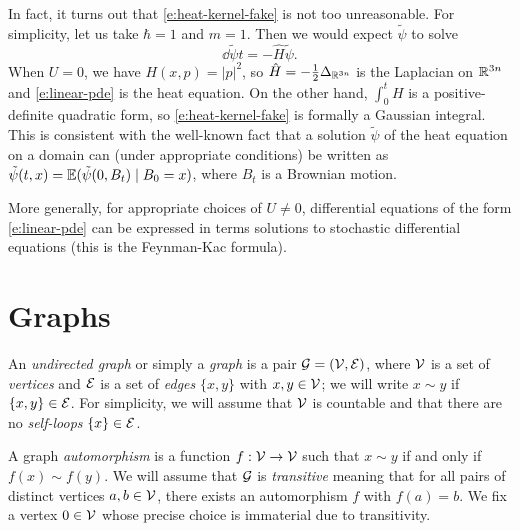 \begin{rk}
In fact, it turns out that \eqref{e:heat-kernel-fake} is not too unreasonable.
For simplicity, let us take $\hbar = 1$ and $m = 1$.
Then we would expect $\tilde\psi$ to solve
\begin{equation}
\label{e:linear-pde}
\dd{\tilde\psi}{t} = -\hat H \tilde\psi.
\end{equation}
When $U = 0$, we have $H(x, p) = |p|^2$, so $\hat H = -\tfrac12 \Delta_{{\mathbb R}^{3n}}$
is the Laplacian on ${\mathbb R}^{3n}$ and \eqref{e:linear-pde} is the heat equation.
On the other hand, $\int_0^t H$ is a positive-definite quadratic form, so
\eqref{e:heat-kernel-fake} is formally a Gaussian integral. This is consistent
with the well-known fact that a solution $\tilde\psi$ of the heat equation
on a domain can (under appropriate conditions) be written as
$\tilde\psi(t, x) = \mathbb{E}(\tilde\psi(0, B_t) \mid B_0 = x)$,
where $B_t$ is a Brownian motion.

More generally, for appropriate choices of $U \ne 0$, differential equations of
the form \eqref{e:linear-pde} can be expressed in terms
solutions to stochastic differential equations (this is the Feynman-Kac formula).
\end{rk}


\section{Graphs}
\label{sec:graphs}


An \emph{undirected graph} or simply a \emph{graph} is a pair $\mathcal{G} = (\mathcal{V}, \mathcal{E})$,
where $\mathcal{V}$
is a set of \emph{vertices} and $\mathcal{E}$ is a set of
\emph{edges} $\{ x, y \}$ with $x, y \in \mathcal{V}$; we will write $x \sim y$ if
$\{ x, y \} \in \mathcal{E}$.
For simplicity, we will assume that $\mathcal{V}$ is countable and that there are no
\emph{self-loops} $\{ x \} \in \mathcal{E}$.

A graph \emph{automorphism} is a function $f : \mathcal{V}\rightarrow\mathcal{V}$ such that
$x \sim y$ if and only if $f(x) \sim f(y)$.
We will assume that $\mathcal{G}$ is \emph{transitive} meaning that for all pairs
of distinct
vertices $a, b \in \mathcal{V}$, there exists an automorphism $f$ with $f(a) = b$.
We fix a vertex $0\in\mathcal{V}$ whose precise choice is immaterial due to
transitivity.


